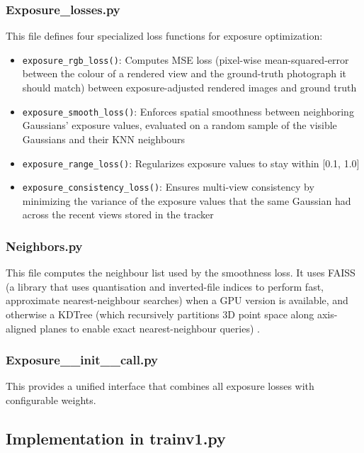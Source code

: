 \documentclass[11pt,a4paper]{article}
\begin{document}
\subsubsection{Exposure\_losses.py}
\label{sec:losses}

This file defines four specialized loss functions for exposure optimization:

\begin{itemize}
\item \texttt{exposure\_rgb\_loss()}: Computes MSE loss (pixel-wise mean-squared-error between the colour of a rendered view and the ground-truth photograph it should match) between exposure-adjusted rendered images and ground truth
\item \texttt{exposure\_smooth\_loss()}: Enforces spatial smoothness between neighboring Gaussians' exposure values, evaluated on a random sample of the visible Gaussians and their KNN neighbours
\item \texttt{exposure\_range\_loss()}: Regularizes exposure values to stay within [0.1, 1.0]
\item \texttt{exposure\_consistency\_loss()}: Ensures multi-view consistency by minimizing the variance of the exposure values that the same Gaussian had across the recent views stored in the tracker
\end{itemize}

\subsubsection{Neighbors.py}

This file computes the neighbour list used by the smoothness loss. It uses FAISS (a library that uses quantisation and inverted-file indices to perform fast, approximate nearest-neighbour searches) \cite{ref18} when a GPU version is available, and otherwise a KDTree (which recursively partitions 3D point space along axis-aligned planes to enable exact nearest-neighbour queries) \cite{ref17}.

\subsubsection{Exposure\_\_init\_\_call.py}

This provides a unified interface that combines all exposure losses with configurable weights.

\subsection{Implementation in trainv1.py}
\end{document}
